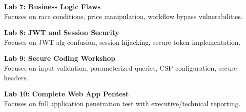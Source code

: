 \vspace{0.2cm}

\noindent\textbf{Lab 7: Business Logic Flaws} \\
Focuses on race conditions, price manipulation, workflow bypass vulnerabilities.

\vspace{0.2cm}

\noindent\textbf{Lab 8: JWT and Session Security} \\
Focuses on JWT alg confusion, session hijacking, secure token implementation.

\vspace{0.2cm}

\noindent\textbf{Lab 9: Secure Coding Workshop} \\
Focuses on input validation, parameterized queries, CSP configuration, secure headers.

\vspace{0.2cm}

\noindent\textbf{Lab 10: Complete Web App Pentest} \\
Focuses on full application penetration test with executive/technical reporting.

\vspace{0.2cm}

\newpage
{}
